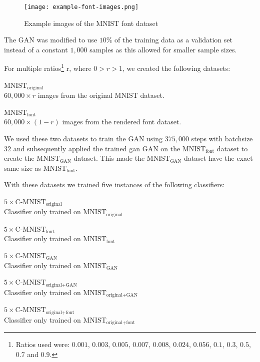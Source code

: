 \documentclass[10pt,twocolumn,letterpaper]{article}
\begin{document}
\begin{figure}[t]
\begin{center}
\texttt{[image: example-font-images.png]}%
\end{center}
   \caption{Example images of the MNIST font dataset}
\label{fig:example-font-images}
\end{figure}

The GAN was modified to use $10\%$ of the training data as a validation set instead of a constant $1,000$ samples as this allowed for smaller sample sizes.

For multiple ratios\footnote{ Ratios used were: $0.001$, $0.003$, $0.005$, $0.007$, $0.008$, $0.024$, $0.056$, $0.1$, $0.3$, $0.5$, $0.7$ and $0.9$. } r, where $0 > r > 1$, we created the following datasets:

\begin{description}
	\item{$\text{MNIST}_\text{original}$} \hfill \\ $60,000 \times r$ images from the original MNIST dataset.
	\item{$\text{MNIST}_\text{font}$} \hfill \\ $60,000 \times (1 - r)$ images from the rendered font dataset.
\end{description}

We used these two datasets to train the GAN using $375,000$ steps with batchsize $32$ and subsequently applied the trained gan GAN on the $\text{MNIST}_\text{font}$ dataset to create the $\text{MNIST}_\text{GAN}$ dataset. This made the $\text{MNIST}_\text{GAN}$ dataset have the exact same size as $\text{MNIST}_\text{font}$.


With these datasets we trained five instances of the following classifiers:

\begin{description}
	\item{$5\times \text{C-MNIST}_\text{original}$} \hfill \\ Classifier only trained on $\text{MNIST}_\text{original}$
	\item{$5\times \text{C-MNIST}_\text{font}$} \hfill \\ Classifier only trained on $\text{MNIST}_\text{font}$
	\item{$5\times \text{C-MNIST}_\text{GAN}$} \hfill \\ Classifier only trained on $\text{MNIST}_\text{GAN}$
	\item{$5\times \text{C-MNIST}_\text{original+GAN}$} \hfill \\ Classifier only trained on $\text{MNIST}_\text{original+GAN}$
	\item{$5\times \text{C-MNIST}_\text{original+font}$} \hfill \\ Classifier only trained on $\text{MNIST}_\text{original+font}$
\end{description}
\end{document}
